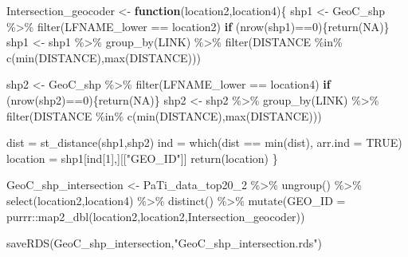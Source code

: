 \documentclass[
]{article}
\newenvironment{Shaded}{\begin{snugshade}}{\end{snugshade}}
\newcommand{\AttributeTok}[1]{\textcolor[rgb]{0.77,0.63,0.00}{#1}}
\newcommand{\ConstantTok}[1]{\textcolor[rgb]{0.00,0.00,0.00}{#1}}
\newcommand{\ControlFlowTok}[1]{\textcolor[rgb]{0.13,0.29,0.53}{\textbf{#1}}}
\newcommand{\DecValTok}[1]{\textcolor[rgb]{0.00,0.00,0.81}{#1}}
\newcommand{\FunctionTok}[1]{\textcolor[rgb]{0.00,0.00,0.00}{#1}}
\newcommand{\NormalTok}[1]{#1}
\newcommand{\OtherTok}[1]{\textcolor[rgb]{0.56,0.35,0.01}{#1}}
\newcommand{\SpecialCharTok}[1]{\textcolor[rgb]{0.00,0.00,0.00}{#1}}
\newcommand{\StringTok}[1]{\textcolor[rgb]{0.31,0.60,0.02}{#1}}
\begin{document}
\begin{Shaded}
\begin{Highlighting}[]
\NormalTok{Intersection\_geocoder }\OtherTok{\textless{}{-}} \ControlFlowTok{function}\NormalTok{(location2,location4)\{}
\NormalTok{  shp1 }\OtherTok{\textless{}{-}}\NormalTok{ GeoC\_shp }\SpecialCharTok{\%\textgreater{}\%} 
    \FunctionTok{filter}\NormalTok{(LFNAME\_lower }\SpecialCharTok{==}\NormalTok{ location2)}
  \ControlFlowTok{if}\NormalTok{ (}\FunctionTok{nrow}\NormalTok{(shp1)}\SpecialCharTok{==}\DecValTok{0}\NormalTok{)\{}\FunctionTok{return}\NormalTok{(}\ConstantTok{NA}\NormalTok{)\}}
\NormalTok{  shp1 }\OtherTok{\textless{}{-}}\NormalTok{ shp1 }\SpecialCharTok{\%\textgreater{}\%} \FunctionTok{group\_by}\NormalTok{(LINK) }\SpecialCharTok{\%\textgreater{}\%} 
    \FunctionTok{filter}\NormalTok{(DISTANCE }\SpecialCharTok{\%in\%} \FunctionTok{c}\NormalTok{(}\FunctionTok{min}\NormalTok{(DISTANCE),}\FunctionTok{max}\NormalTok{(DISTANCE)))}
  
\NormalTok{  shp2 }\OtherTok{\textless{}{-}}\NormalTok{ GeoC\_shp }\SpecialCharTok{\%\textgreater{}\%} 
    \FunctionTok{filter}\NormalTok{(LFNAME\_lower }\SpecialCharTok{==}\NormalTok{ location4) }
  \ControlFlowTok{if}\NormalTok{ (}\FunctionTok{nrow}\NormalTok{(shp2)}\SpecialCharTok{==}\DecValTok{0}\NormalTok{)\{}\FunctionTok{return}\NormalTok{(}\ConstantTok{NA}\NormalTok{)\}}
\NormalTok{  shp2 }\OtherTok{\textless{}{-}}\NormalTok{ shp2 }\SpecialCharTok{\%\textgreater{}\%} \FunctionTok{group\_by}\NormalTok{(LINK) }\SpecialCharTok{\%\textgreater{}\%} 
    \FunctionTok{filter}\NormalTok{(DISTANCE }\SpecialCharTok{\%in\%} \FunctionTok{c}\NormalTok{(}\FunctionTok{min}\NormalTok{(DISTANCE),}\FunctionTok{max}\NormalTok{(DISTANCE)))}
  
\NormalTok{  dist }\OtherTok{=} \FunctionTok{st\_distance}\NormalTok{(shp1,shp2)}
\NormalTok{  ind }\OtherTok{=} \FunctionTok{which}\NormalTok{(dist }\SpecialCharTok{==} \FunctionTok{min}\NormalTok{(dist), }\AttributeTok{arr.ind =} \ConstantTok{TRUE}\NormalTok{)}
\NormalTok{  location }\OtherTok{=}\NormalTok{ shp1[ind[}\DecValTok{1}\NormalTok{],][[}\StringTok{"GEO\_ID"}\NormalTok{]]}
  \FunctionTok{return}\NormalTok{(location)}
\NormalTok{\}}

\NormalTok{GeoC\_shp\_intersection }\OtherTok{\textless{}{-}}\NormalTok{ PaTi\_data\_top20\_2 }\SpecialCharTok{\%\textgreater{}\%} \FunctionTok{ungroup}\NormalTok{() }\SpecialCharTok{\%\textgreater{}\%} \FunctionTok{select}\NormalTok{(location2,location4) }\SpecialCharTok{\%\textgreater{}\%} \FunctionTok{distinct}\NormalTok{() }\SpecialCharTok{\%\textgreater{}\%} 
  \FunctionTok{mutate}\NormalTok{(}\AttributeTok{GEO\_ID =}\NormalTok{ purrr}\SpecialCharTok{::}\FunctionTok{map2\_dbl}\NormalTok{(location2,location2,Intersection\_geocoder))}

\FunctionTok{saveRDS}\NormalTok{(GeoC\_shp\_intersection,}\StringTok{"GeoC\_shp\_intersection.rds"}\NormalTok{)}
\end{Highlighting}
\end{Shaded}
\end{document}
